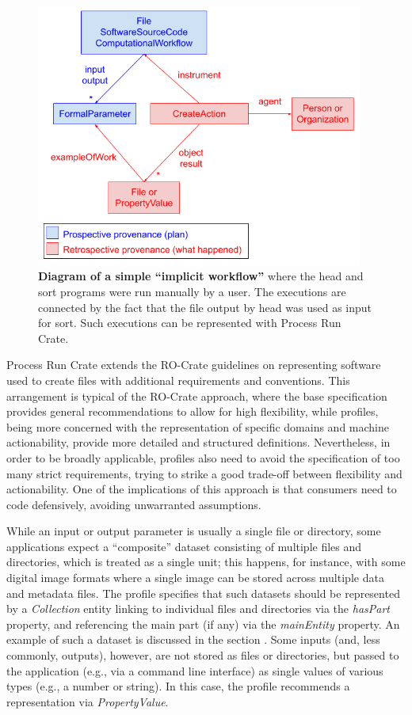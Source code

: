 \documentclass[10pt,letterpaper]{article}
\begin{document}
\begin{figure}[!h]
\includegraphics[width=29em]{image2.png}
\caption{{\bf Diagram of a simple ``implicit workflow''} where the head and sort programs were run manually by a user.
The executions are connected by the fact that the file output by head was used as input for sort.
Such executions can be represented with Process Run Crate.}
\label{fig:head_sort}
\end{figure}


Process Run Crate extends the RO-Crate guidelines on representing software used to create files with additional requirements and conventions.
This arrangement is typical of the RO-Crate approach, where the base specification provides general recommendations to allow for high flexibility, while profiles, being more concerned with the representation of specific domains and machine actionability, provide more detailed and structured definitions.
Nevertheless, in order to be broadly applicable, profiles also need to avoid the specification of too many strict requirements, trying to strike a good trade-off between flexibility and actionability.
One of the implications of this approach is that consumers need to code defensively, avoiding unwarranted assumptions.

While an input or output parameter is usually a single file or directory, some applications expect a ``composite'' dataset consisting of multiple files and directories, which is treated as a single unit;
this happens, for instance, with some digital image formats where a single image can be stored across multiple data and metadata files.
The profile specifies that such datasets should be represented by a
\emph{Collection} entity linking to individual files and directories via the \emph{hasPart} property, and referencing the main part (if any) via the \emph{mainEntity} property.
An example of such a dataset is discussed in the section .
Some inputs (and, less commonly, outputs), however, are not stored as files or directories, but passed to the application (e.g., via a command line interface) as single values of various types (e.g., a number or string).
In this case, the profile recommends a representation via \emph{PropertyValue}.
\end{document}
